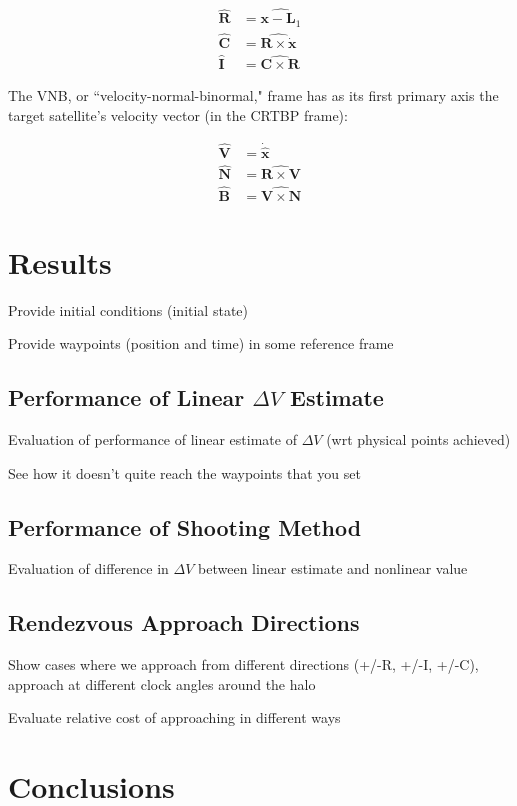 \documentclass[]{article}
\begin{document}
\begin{equation}
\begin{aligned}
\mathbf{\hat{R}} &= \widehat{\mathbf{x} - \mathbf{L}_1} \\
\mathbf{\hat{C}} &= \widehat{\mathbf{R} \times \mathbf{\dot{x}}} \\
\mathbf{\hat{I}} &= \widehat{\mathbf{C} \times \mathbf{R}}
\end{aligned}
\end{equation}

The VNB, or ``velocity-normal-binormal," frame has as its first primary axis the target satellite's velocity vector (in the CRTBP frame):


\begin{equation}
\begin{aligned}
\mathbf{\hat{V}} &= \mathbf{\dot{\hat{x}}} \\
\mathbf{\hat{N}} &= \widehat{\mathbf{R} \times \mathbf{V}}  \\
\mathbf{\hat{B}} &= \widehat{\mathbf{V} \times \mathbf{N}} 
\end{aligned}
\end{equation}

\section{Results}

Provide initial conditions (initial state)

Provide waypoints (position and time) in some reference frame

\subsection{Performance of Linear \(\Delta V\) Estimate}
Evaluation of performance of linear estimate of \(\Delta V\) (wrt physical points achieved)

See how it doesn’t quite reach the waypoints that you set

\subsection{Performance of Shooting Method}

Evaluation of difference in \(\Delta V\) between linear estimate and nonlinear value

\subsection{Rendezvous Approach Directions}
Show cases where we approach from different directions (+/-R, +/-I, +/-C), approach at different clock angles around the halo

Evaluate relative cost of approaching in different ways


\section{Conclusions}

\begin{thebibliography}{99}
\end{thebibliography}
\end{document}
